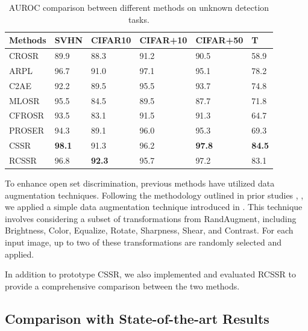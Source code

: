 \documentclass{gji}
\begin{document}
     \begin{table}
 \begin{minipage}{115mm}
\centering
\caption{AUROC comparison between different methods on unknown detection tasks. }
\label{anymode}
\begin{tabular}{|@{}l|l|l|l|l|l|} \hline  
Methods& SVHN& CIFAR10& CIFAR+10& CIFAR+50& T\\ \hline  

CROSR\cite{10}& 89.9& 88.3&
  91.2& 90.5& 58.9\\[2pt] \hline  
 ARPL\cite{10}& 96.7& 91.0& 97.1& 95.1&78.2\\ \hline  
C2AE\cite{26}& 92.2&89.5&
  95.5& 93.7& 74.8\\[1.5pt] \hline  
MLOSR\cite{27}& 95.5& 84.5&
  89.5& 87.7& 71.8\\[1.5pt] \hline  
CFROSR\cite{28}& 93.5& 83.1&
  91.5& 91.3& 64.7\\[1.5pt] \hline  
PROSER\cite{48}& 94.3& 89.1&
  96.0& 95.3& 69.3\\[1.5pt] \hline  
CSSR& \bf{98.1}& 91.3&
  96.2& \bf{97.8}& \bf{84.5}\\[1.5pt] \hline  
RCSSR& 96.8& \bf{92.3}&
  95.7& 97.2& 83.1\\[1.5pt] \hline 
\end{tabular}

\end{minipage}
\end{table}
    
    To enhance open set discrimination, previous methods have utilized data augmentation techniques. Following the methodology outlined in prior studies \cite{28}, \cite{48}, we applied a simple data augmentation technique introduced in \cite{8}. This technique involves considering a subset of transformations from RandAugment, including Brightness, Color, Equalize, Rotate, Sharpness, Shear, and Contrast. For each input image, up to two of these transformations are randomly selected and applied.
    
    In addition to prototype CSSR, we also implemented and evaluated RCSSR to provide a comprehensive comparison between the two methods.



\subsection{Comparison with State-of-the-art Results}
\end{document}
